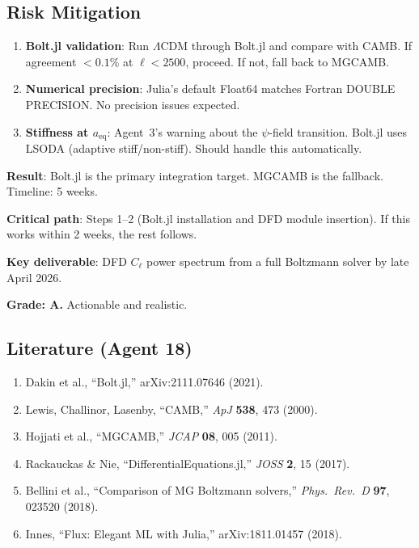 \documentclass[11pt,a4paper]{article}
\begin{document}
\subsection{Risk Mitigation}

\begin{enumerate}
\item \textbf{Bolt.jl validation}: Run $\Lambda$CDM through Bolt.jl and compare with CAMB. If agreement $< 0.1\%$ at $\ell < 2500$, proceed. If not, fall back to MGCAMB.
\item \textbf{Numerical precision}: Julia's default Float64 matches Fortran DOUBLE PRECISION. No precision issues expected.
\item \textbf{Stiffness at $a_{\mathrm{eq}}$}: Agent~3's warning about the $\psi$-field transition. Bolt.jl uses LSODA (adaptive stiff/non-stiff). Should handle this automatically.
\end{enumerate}

\begin{tcolorbox}[colback=green!5!white, colframe=green!60!black, title={Agent 18: Integration Strategy --- BOLT.JL PRIMARY, MGCAMB FALLBACK}]
\textbf{Result}: Bolt.jl is the primary integration target. MGCAMB is the fallback. Timeline: 5 weeks.

\textbf{Critical path}: Steps 1--2 (Bolt.jl installation and DFD module insertion). If this works within 2 weeks, the rest follows.

\textbf{Key deliverable}: DFD $C_\ell$ power spectrum from a full Boltzmann solver by late April 2026.

\textbf{Grade: A.} Actionable and realistic.
\end{tcolorbox}

\subsection{Literature (Agent 18)}

\begin{enumerate}
\item Dakin et al., ``Bolt.jl,'' arXiv:2111.07646 (2021).
\item Lewis, Challinor, Lasenby, ``CAMB,'' \textit{ApJ} \textbf{538}, 473 (2000).
\item Hojjati et al., ``MGCAMB,'' \textit{JCAP} \textbf{08}, 005 (2011).
\item Rackauckas \& Nie, ``DifferentialEquations.jl,'' \textit{JOSS} \textbf{2}, 15 (2017).
\item Bellini et al., ``Comparison of MG Boltzmann solvers,'' \textit{Phys.\ Rev.\ D} \textbf{97}, 023520 (2018).
\item Innes, ``Flux: Elegant ML with Julia,'' arXiv:1811.01457 (2018).
\end{enumerate}
\end{document}
